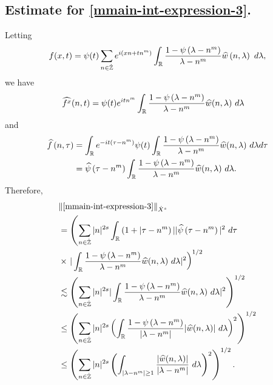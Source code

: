 \subsection{Estimate for
\texorpdfstring{\eqref{mmain-int-expression-3}}{Expression 3}.}
Letting $$f(x,t) = \psi(t) \sum_{n \in \dot{\mathbb{Z}}} e^{i\left( xn + tn^m \right)} 
\int_{\mathbb{R}} \frac{1 - \psi\left( \lambda - n^m \right)}{\lambda - n^m} 
\widehat{w} \left( n, \lambda \right) \ d \lambda,$$ we have
%
%
\begin{equation*}
	\begin{split}
		& \widehat{f^x}(n, t) = \psi(t) e^{itn^m} \int_{\mathbb{R}}
		\frac{1 - \psi\left( \lambda - n^m \right)}{\lambda - n^m} 
		\widehat{w}(n, \lambda) \ d \lambda
	\end{split}
\end{equation*}
and
\begin{equation*}
	\begin{split}
		 \widehat{f}\left( n, \tau \right)
		 & = \int_{\mathbb{R}} e^{-it\left( \tau - n^m 
		\right)} \psi(t) \int_{\mathbb{R}} \frac{1 - \psi\left( 
		\lambda - n^m 
		\right)}{\lambda - n^m} \widehat{w}(n, \lambda) \ d \lambda d \tau
		\\
		& = \widehat{\psi}\left( \tau - n^m \right) \int_{\mathbb{R}} 
		\frac{1 - \psi\left( 
		\lambda - n^m 
		\right)}{\lambda - n^m} \widehat{w}(n, \lambda) \ d \lambda.
	\end{split}
\end{equation*}
Therefore,
%
%
\begin{equation*}
	\begin{split}
		& \| \eqref{mmain-int-expression-3} \|_{\dot{X}^s} 
		\\
		& = \left( \sum_{n \in \dot{\mathbb{Z}}} |n|^{2s} \int_{\mathbb{R}} \left( 1 + | \tau - n^{m
		} \right ) | | \widehat{\psi}\left( \tau - n^m \right) |^2 \ d \tau
		\right.
		\\
		& \times \left . |
		\int_{\mathbb{R}} \frac{1 - \psi\left( \lambda - n^m \right)}{\lambda -
		n^m} \widehat{w}(n, \lambda) \ d \lambda |^2  \right)^{1/2}
		\\
		& \lesssim \left( \sum_{n \in \dot{\mathbb{Z}}} |n|^{2s} | \int_{\mathbb{R}}
		\frac{1 - \psi\left( \lambda - n^m \right)}{\lambda - n^m}
		\widehat{w}(n, \lambda) \ d\lambda |^2 \right)^{1/2}
		\\
		& \le \left( \sum_{n \in \dot{\mathbb{Z}}} |n|^{2s}  \left ( \int_{\mathbb{R}}
		\frac{1 - \psi\left( \lambda - n^m \right)}{|\lambda - n^m|}
		|\widehat{w}(n, \lambda) | \ d\lambda \right )^2 \right)^{1/2}
		\\
		& \le \left( \sum_{n \in \dot{\mathbb{Z}}} |n|^{2s}  \left ( \int_{| \lambda - 
		n^m | \ge 1}
		\frac{|\widehat{w}(n, \lambda) | }{|\lambda - n^m|}
		\ d\lambda \right )^2 \right)^{1/2}.
	\end{split}
\end{equation*}
